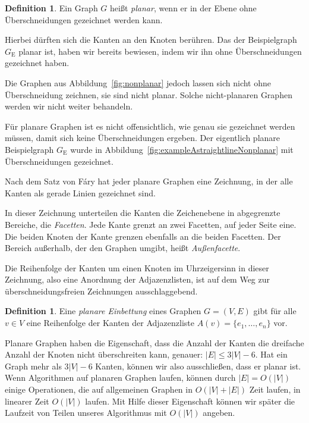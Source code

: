 \documentclass[a4paper]{scrreprt}
\theoremstyle{definition}
\newtheorem{definition}[satz]{Definition}
\begin{document}
\begin{definition}
  Ein Graph $G$ heißt \emph{planar}, wenn er in der Ebene ohne Überschneidungen gezeichnet werden kann.
\end{definition}

Hierbei dürften sich die Kanten an den Knoten berühren. Das der Beispielgraph $G_\text{E}$ planar ist, haben wir bereits bewiesen, indem wir ihn ohne Überschneidungen gezeichnet haben. 

Die Graphen aus Abbildung~\ref{fig:nonplanar} jedoch lassen sich nicht ohne Überschneidung zeichnen, sie sind nicht planar. Solche nicht-planaren Graphen werden wir nicht weiter behandeln. 

Für planare Graphen ist es nicht offensichtlich, wie genau sie gezeichnet werden müssen, damit sich keine Überschneidungen ergeben. Der eigentlich planare Beispielgraph $G_\text{E}$ wurde in Abbildung~\ref{fig:exampleAstraightlineNonplanar} mit Überschneidungen gezeichnet. 

Nach dem Satz von Fáry hat jeder planare Graphen eine Zeichnung, in der alle Kanten als gerade Linien gezeichnet sind. %

In dieser Zeichnung unterteilen die Kanten die Zeichenebene in abgegrenzte Bereiche, die \emph{Facetten}. Jede Kante grenzt an zwei Facetten, auf jeder Seite eine. Die beiden Knoten der Kante grenzen ebenfalls an die beiden Facetten. Der Bereich außerhalb, der den Graphen umgibt, heißt \emph{Außenfacette}.

Die Reihenfolge der Kanten um einen Knoten im Uhrzeigersinn in dieser Zeichnung, also eine Anordnung der Adjazenzlisten, ist auf dem Weg zur überschneidungsfreien Zeichnungen ausschlaggebend.


\begin{definition}
  Eine \emph{planare Einbettung} eines Graphen $G = (V, E)$ gibt für alle $v \in V$ eine Reihenfolge der Kanten der Adjazenzliste $A(v) = \{e_1, \dots, e_n\}$ vor.
\end{definition}

Planare Graphen haben die Eigenschaft, dass die Anzahl der Kanten die dreifache Anzahl der Knoten nicht überschreiten kann, genauer: $|E| \leq 3 |V| - 6$. Hat ein Graph mehr als $3 |V| - 6$ Kanten, können wir also ausschließen, dass er planar ist. Wenn Algorithmen auf planaren Graphen laufen, können durch $|E| = O(|V|)$ einige Operationen, die auf allgemeinen Graphen in $O(|V| + |E|)$ Zeit laufen, in linearer Zeit $O(|V|)$ laufen. Mit Hilfe dieser Eigenschaft können wir später die Laufzeit von Teilen unseres Algorithmus mit $O(|V|)$ angeben.
\end{document}

